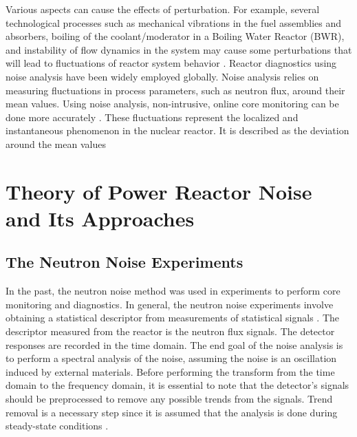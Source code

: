 Various aspects can cause the effects of perturbation. For example, several technological processes such as mechanical vibrations in the fuel assemblies and absorbers, boiling of the coolant/moderator in a Boiling Water Reactor (BWR), and instability of flow dynamics in the system may cause some perturbations that will lead to fluctuations of reactor system behavior \cite{thiePowerReactorNoise1981}. Reactor diagnostics using noise analysis have been widely employed globally. Noise analysis relies on measuring fluctuations in process parameters, such as neutron flux, around their mean values. Using noise analysis, non-intrusive, online core monitoring can be done more accurately \cite{demaziereDevelopmentNonintrusiveMethod2002}. These fluctuations represent the localized and instantaneous phenomenon in the nuclear reactor. It is described as the deviation around the mean values
 
\section{Theory of Power Reactor Noise and Its Approaches}

\subsection{The Neutron Noise Experiments}

In the past, the neutron noise method was used in experiments to perform core monitoring and diagnostics. In general, the neutron noise experiments involve obtaining a statistical descriptor from measurements of statistical signals \cite{thiePowerReactorNoise1981}. The descriptor measured from the reactor is the neutron flux signals. The detector responses are recorded in the time domain. The end goal of the noise analysis is to perform a spectral analysis of the noise, assuming the noise is an oscillation induced by external materials. Before performing the transform from the time domain to the frequency domain, it is essential to note that the detector’s signals should be preprocessed to remove any possible trends from the signals. Trend removal is a necessary step since it is assumed that the analysis is done during steady-state conditions \cite{mylonakisCORESIMSIMULATIONS2021}.

